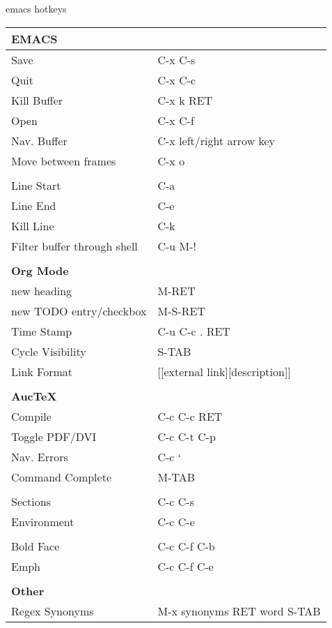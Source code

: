 \documentclass[12pt,letterpaper,oneside]{article}
\begin{document}
\sffamily
\begin{center} \huge emacs hotkeys \end{center}

\begin{center}
\begin{tabular}{l l}
\textbf{EMACS} & \\ \hline
Save & C-x C-s \\ \hline 
Quit & C-x C-c \\ \hline 
Kill Buffer & C-x k RET \\ \hline
Open & C-x C-f \\ \hline
Nav. Buffer & C-x left/right arrow key\\ \hline
Move between frames & C-x o \\ \hline
&\\
Line Start & C-a \\ \hline
Line End & C-e \\ \hline 
Kill Line & C-k \\ \hline

Filter buffer through shell & C-u M-! \\ \hline
& \\
\textbf{Org Mode} & \\ \hline 
new heading & M-RET \\ \hline
new TODO entry/checkbox & M-S-RET\\ \hline 
Time Stamp & C-u C-c . RET \\ \hline
Cycle Visibility & S-TAB \\ \hline
Link Format & [[external link][description]] \\ \hline
&\\
\textbf{AucTeX} \\ \hline 
Compile & C-c C-c RET \\ \hline
Toggle PDF/DVI & C-c C-t C-p \\ \hline
Nav. Errors & C-c ` \\ \hline 
Command Complete & M-TAB \\ \hline
& \\ 
Sections & C-c C-s \\ \hline
Environment & C-c C-e \\ \hline 
& \\
Bold Face & C-c C-f C-b \\ \hline
Emph & C-c C-f C-e \\ \hline
&\\
\textbf{Other} \\ \hline
Regex Synonyms & M-x synonyms RET word S-TAB \\ \hline

\end{tabular}
\end{center}
\end{document}
